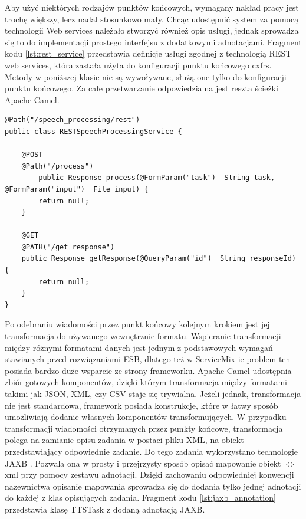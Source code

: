 Aby użyć niektórych rodzajów punktów końcowych, wymagany nakład pracy jest trochę większy, lecz nadal stosunkowo mały. Chcąc udostępnić system za pomocą technologii Web services należało stworzyć również opis usługi, jednak sprowadza się to do implementacji prostego interfejsu z dodatkowymi adnotacjami.  Fragment kodu \ref{lst:rest_service} przedstawia definicje usługi zgodnej z technologią REST web services, która zastała użyta do konfiguracji punktu końcowego cxfrs. Metody w poniższej klasie nie są wywoływane, służą one tylko do konfiguracji punktu końcowego. Za całe przetwarzanie odpowiedzialna jest reszta ścieżki Apache Camel.


\lstset{language=Java, tabsize=4, caption=Definicja REST-owego punktu końcowego.,label=lst:rest_service}


\begin{center}
\begin{lstlisting}
@Path("/speech_processing/rest")
public class RESTSpeechProcessingService {

	@POST
	@Path("/process")
    	public Response process(@FormParam("task")  String task, @FormParam("input")  File input) {
		return null;
	}

	@GET
	@PATH("/get_response")
	public Response getResponse(@QueryParam("id")  String responseId) {
		return null;
	}
}

\end{lstlisting}
\end{center}

Po odebraniu wiadomości przez punkt końcowy kolejnym krokiem jest jej transformacja do używanego wewnętrznie formatu. Wspieranie transformacji między różnymi formatami danych jest jednym z podstawowych wymagań stawianych przed rozwiązaniami ESB, dlatego też w ServiceMix-ie problem ten posiada bardzo duże wsparcie ze strony frameworku. Apache Camel udostępnia zbiór gotowych komponentów, dzięki którym transformacja między formatami takimi jak JSON, XML, czy CSV staje się trywialna. Jeżeli jednak, transformacja nie jest standardowa, framework posiada konstrukcje, które w łatwy sposób umożliwiają dodanie własnych komponentów transformujących. W przypadku transformacji wiadomości otrzymanych przez punkty końcowe, transformacja polega na zamianie opisu zadania w postaci pliku XML, na obiekt przedstawiający odpowiednie zadanie. Do tego zadania wykorzystano technologie JAXB \cite{jaxb2008}. Pozwala ona w prosty i przejrzysty sposób opisać mapowanie obiekt \begin{math}\Leftrightarrow\end{math} xml przy pomocy zestawu adnotacji. Dzięki zachowaniu odpowiedniej konwencji nazewnictwa opisanie mapowania sprowadza się do dodania tylko jednej adnotacji do każdej z klas opisujących zadania. Fragment kodu \ref{lst:jaxb_annotation} przedstawia klasę TTSTask z dodaną adnotacją JAXB.



